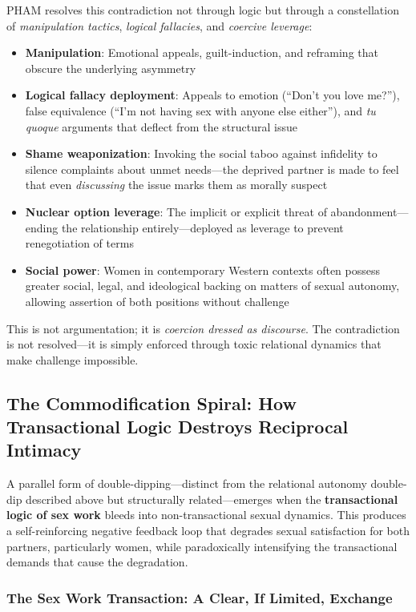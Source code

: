 \documentclass[12pt, letterpaper]{article}
\begin{document}
PHAM resolves this contradiction not through logic but through a constellation of \textit{manipulation tactics}, \textit{logical fallacies}, and \textit{coercive leverage}:

\begin{itemize}
    \item \textbf{Manipulation}: Emotional appeals, guilt-induction, and reframing that obscure the underlying asymmetry
    \item \textbf{Logical fallacy deployment}: Appeals to emotion (``Don't you love me?''), false equivalence (``I'm not having sex with anyone else either''), and \textit{tu quoque} arguments that deflect from the structural issue
    \item \textbf{Shame weaponization}: Invoking the social taboo against infidelity to silence complaints about unmet needs---the deprived partner is made to feel that even \textit{discussing} the issue marks them as morally suspect
    \item \textbf{Nuclear option leverage}: The implicit or explicit threat of abandonment---ending the relationship entirely---deployed as leverage to prevent renegotiation of terms
    \item \textbf{Social power}: Women in contemporary Western contexts often possess greater social, legal, and ideological backing on matters of sexual autonomy, allowing assertion of both positions without challenge
\end{itemize}

This is not argumentation; it is \textit{coercion dressed as discourse}. The contradiction is not resolved---it is simply enforced through toxic relational dynamics that make challenge impossible.

\subsection{The Commodification Spiral: How Transactional Logic Destroys Reciprocal Intimacy}

A parallel form of double-dipping---distinct from the relational autonomy double-dip described above but structurally related---emerges when the \textbf{transactional logic of sex work} bleeds into non-transactional sexual dynamics. This produces a self-reinforcing negative feedback loop that degrades sexual satisfaction for both partners, particularly women, while paradoxically intensifying the transactional demands that cause the degradation.

\subsubsection{The Sex Work Transaction: A Clear, If Limited, Exchange}
\end{document}
